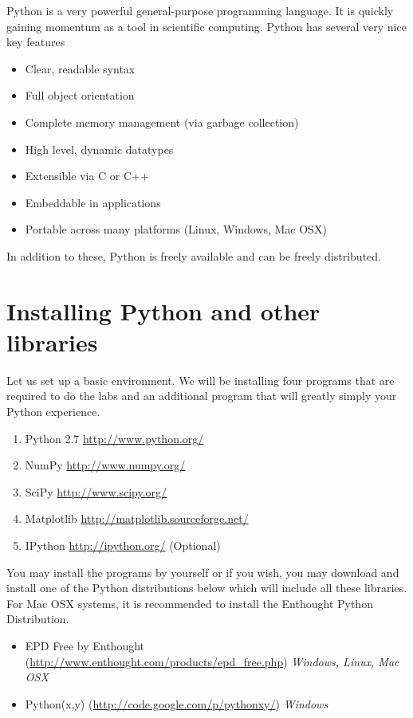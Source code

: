 \label{lab:Essential_Python}

Python is a very powerful general-purpose programming language.  It is quickly gaining momentum as a tool in scientific computing.  Python has several very nice key features
\begin{itemize}
\item Clear, readable syntax
\item Full object orientation
\item Complete memory management (via garbage collection)
\item High level, dynamic datatypes
\item Extensible via C or C++
\item Embeddable in applications
\item Portable across many platforms (Linux, Windows, Mac OSX)
\end{itemize}
In addition to these, Python is freely available and can be freely distributed.

\section*{Installing Python and other libraries}
Let us set up a basic environment.  We will be installing four programs that are required to do the labs and an additional program that will greatly simply your Python experience.
\begin{enumerate}
\item Python 2.7 \url{http://www.python.org/}
\item NumPy \url{http://www.numpy.org/}
\item SciPy \url{http://www.scipy.org/}
\item Matplotlib \url{http://matplotlib.sourceforge.net/}
\item IPython \url{http://ipython.org/} (Optional)
\end{enumerate}
You may install the programs by yourself or if you wish, you may download and install one of the Python distributions below which will include all these libraries.  For Mac OSX systems, it is recommended to install the Enthought Python Distribution.
\begin{itemize}
\item EPD Free by Enthought (\url{http://www.enthought.com/products/epd_free.php}) \emph{Windows, Linux, Mac OSX}
\item Python(x,y) (\url{http://code.google.com/p/pythonxy/}) \emph{Windows}
\end{itemize}

